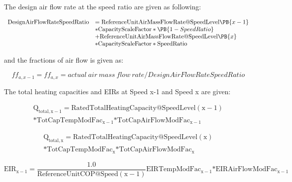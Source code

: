 The design air flow rate at the speed ratio are given as following:

\begin{equation}
  \begin{array}{rl}
    \mathrm{DesignAirFlowRateSpeedRatio} &= \mathrm{ReferenceUnitAirMassFlowRate @ SpeedLevel} \PB{x-1} \\
                                     &* \mathrm{CapacityScaleFactor} * \PB{1 - SpeedRatio} \\
                                     &+ \mathrm{ReferenceUnitAirMassFlowRate @ SpeedLevel} \PB{x} \\
                                     &* \mathrm{CapacityScaleFactor*SpeedRatio}
  \end{array}
\end{equation}

and the fractions of air flow is given as:

\begin{equation}
ff_{a,x-1} = ff_{a,x} = actual~air~mass~flow~rate/DesignAirFlowRateSpeedRatio
\end{equation}

The total heating capacities and EIRs at Speed x-1 and Speed x are given:

\begin{equation}
\begin{split}
{{\mathrm{Q}}_{{\mathrm{total}},{\mathrm{x}} - 1}} = {\mathrm{RatedTotalHeatingCapacity}}@{\mathrm{SpeedLevel}}\left( {{\mathrm{x}} - 1} \right) \\
{\mathrm{*TotCapTempModFa}}{{\mathrm{c}}_{{\mathrm{x}} - 1}} {\mathrm{*TotCapAirFlowModFa}}{{\mathrm{c}}_{{\mathrm{x}} - 1}}
\end{split}
\end{equation}

\begin{equation}
\begin{split}
{{\mathrm{Q}}_{{\mathrm{total}},{\mathrm{x}}}} = {\mathrm{RatedTotalHeatingCapacity}}@{\mathrm{SpeedLevel}}\left( {\mathrm{x}} \right) \\
{\mathrm{*TotCapTempModFa}}{{\mathrm{c}}_{\mathrm{x}}} {\mathrm{*TotCapAirFlowModFa}}{{\mathrm{c}}_{\mathrm{x}}}
\end{split}
\end{equation}

\begin{equation}
{\mathrm{EI}}{{\mathrm{R}}_{{\mathrm{x}} - 1}} = \frac{{1.0}}{{{\mathrm{ReferenceUnitCOP}}@{\mathrm{Speed}}({\mathrm{x}} - 1)}}{\mathrm{EIRTempModFa}}{{\mathrm{c}}_{{\mathrm{x}} - 1}}{\mathrm{*EIRAirFlowModFa}}{{\mathrm{c}}_{{\mathrm{x}} - 1}}
\end{equation}

